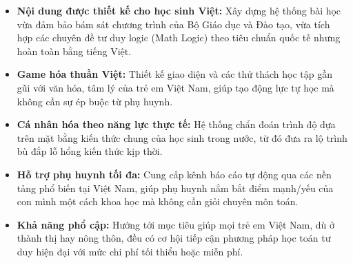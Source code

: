 \begin{itemize}
	\item \textbf{Nội dung được thiết kế cho học sinh Việt:} Xây dựng hệ thống bài học vừa đảm bảo bám sát chương trình của Bộ Giáo dục và Đào tạo, vừa tích hợp các chuyên đề tư duy logic (Math Logic) theo tiêu chuẩn quốc tế nhưng hoàn toàn bằng tiếng Việt.
	\item \textbf{Game hóa thuần Việt:} Thiết kế giao diện và các thử thách học tập gần gũi với văn hóa, tâm lý của trẻ em Việt Nam, giúp tạo động lực tự học mà không cần sự ép buộc từ phụ huynh.
	\item \textbf{Cá nhân hóa theo năng lực thực tế:} Hệ thống chẩn đoán trình độ dựa trên mặt bằng kiến thức chung của học sinh trong nước, từ đó đưa ra lộ trình bù đắp lỗ hổng kiến thức kịp thời.
	\item \textbf{Hỗ trợ phụ huynh tối đa:} Cung cấp kênh báo cáo tự động qua các nền tảng phổ biến tại Việt Nam, giúp phụ huynh nắm bắt điểm mạnh/yếu của con mình một cách khoa học mà không cần giỏi chuyên môn toán.
	\item \textbf{Khả năng phổ cập:} Hướng tới mục tiêu giúp mọi trẻ em Việt Nam, dù ở thành thị hay nông thôn, đều có cơ hội tiếp cận phương pháp học toán tư duy hiện đại với mức chi phí tối thiểu hoặc miễn phí.
\end{itemize}